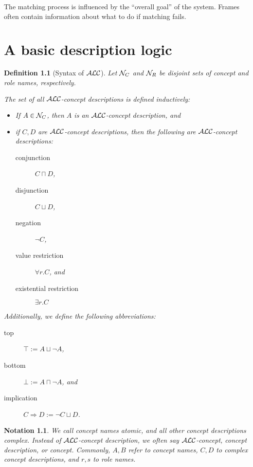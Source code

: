 \documentclass[openany]{scrbook}
\theoremstyle{break}
\newtheorem{Definition}[Theorem]{Definition}
\theoremstyle{nonumberbreak}
\newtheorem{Notation}{Notation}
\theoremstyle{nonumberplain}
\theoremstyle{nonumberbreak}
\newcommand{\then}{\Longrightarrow}
\newcommand{\ALC}{{\cal A}{\cal L}{\cal C}}
\begin{document}
The matching process is influenced by the ``overall goal'' of the
system. Frames often contain information about what to do if matching
fails.

\chapter{A basic description logic}
\label{chap:2}

\begin{Definition}[Syntax of $\ALC$]
  \label{2.1}
  Let ${\cal N}_C$ and ${\cal N}_R$ be disjoint sets of concept and
  role names, respectively.

  The set of all $\ALC$-concept descriptions is defined inductively:
  \begin{itemize}
  \item If $A \in {\cal N}_C$, then $A$ is an $\ALC$-concept
    description, and
  \item if $C, D$ are $\ALC$-concept descriptions, then the following
    are $\ALC$-concept descriptions:
    \begin{description}
    \item[conjunction] $C \sqcap D$,
    \item[disjunction] $C \sqcup D$,
    \item[negation] $\neg C$,
    \item[value restriction] $\forall r.C$, and
    \item[existential restriction] $\exists r.C$
    \end{description}
  \end{itemize}

  Additionally, we define the following abbreviations:
  \begin{description}
  \item[top] $\top := A \sqcup \neg A$,
  \item[bottom] $\bot := A \sqcap \neg A$, and
  \item[implication] $C \then D := \neg C \sqcup D$.
  \end{description}
\end{Definition}

\begin{Notation}
  We call concept names atomic, and all other concept descriptions
  complex. Instead of $\ALC$-concept description, we often say
  $\ALC$-concept, concept description, or concept. Commonly, $A, B$
  refer to concept names, $C, D$ to complex concept descriptions, and
  $r, s$ to role names.
\end{Notation}
\end{document}
